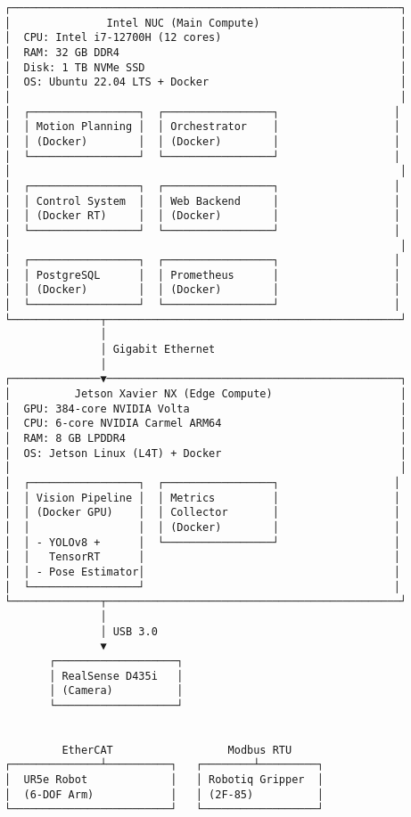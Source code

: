 \documentclass[
]{article}
\begin{document}
\begin{verbatim}
┌─────────────────────────────────────────────────────────────┐
│               Intel NUC (Main Compute)                      │
│  CPU: Intel i7-12700H (12 cores)                            │
│  RAM: 32 GB DDR4                                            │
│  Disk: 1 TB NVMe SSD                                        │
│  OS: Ubuntu 22.04 LTS + Docker                              │
│                                                             │
│  ┌─────────────────┐  ┌─────────────────┐                  │
│  │ Motion Planning │  │ Orchestrator    │                  │
│  │ (Docker)        │  │ (Docker)        │                  │
│  └─────────────────┘  └─────────────────┘                  │
│                                                             │
│  ┌─────────────────┐  ┌─────────────────┐                  │
│  │ Control System  │  │ Web Backend     │                  │
│  │ (Docker RT)     │  │ (Docker)        │                  │
│  └─────────────────┘  └─────────────────┘                  │
│                                                             │
│  ┌─────────────────┐  ┌─────────────────┐                  │
│  │ PostgreSQL      │  │ Prometheus      │                  │
│  │ (Docker)        │  │ (Docker)        │                  │
│  └─────────────────┘  └─────────────────┘                  │
└──────────────┬──────────────────────────────────────────────┘
               │
               │ Gigabit Ethernet
               │
┌──────────────▼──────────────────────────────────────────────┐
│          Jetson Xavier NX (Edge Compute)                    │
│  GPU: 384-core NVIDIA Volta                                 │
│  CPU: 6-core NVIDIA Carmel ARM64                            │
│  RAM: 8 GB LPDDR4                                           │
│  OS: Jetson Linux (L4T) + Docker                            │
│                                                             │
│  ┌─────────────────┐  ┌─────────────────┐                  │
│  │ Vision Pipeline │  │ Metrics         │                  │
│  │ (Docker GPU)    │  │ Collector       │                  │
│  │                 │  │ (Docker)        │                  │
│  │ - YOLOv8 +      │  └─────────────────┘                  │
│  │   TensorRT      │                                       │
│  │ - Pose Estimator│                                       │
│  └─────────────────┘                                       │
└──────────────┬──────────────────────────────────────────────┘
               │
               │ USB 3.0
               ▼
       ┌───────────────────┐
       │ RealSense D435i   │
       │ (Camera)          │
       └───────────────────┘


         EtherCAT                  Modbus RTU
┌──────────────┴──────────┐   ┌────────┴─────────┐
│  UR5e Robot             │   │ Robotiq Gripper  │
│  (6-DOF Arm)            │   │ (2F-85)          │
└─────────────────────────┘   └──────────────────┘
\end{verbatim}
\end{document}
